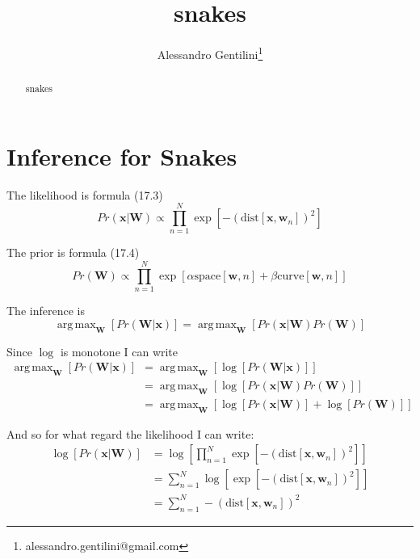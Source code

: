 \documentclass[a4paper,12pt]{article}
\title{snakes}
\author{Alessandro Gentilini\thanks{alessandro.gentilini@gmail.com}}
\DeclareMathOperator*{\argmax}{arg\,max}
\begin{document}
\maketitle

\begin{abstract}
snakes
\end{abstract} 

\section{Inference for Snakes}
The likelihood is formula (17.3)
\begin{equation}
Pr(\mathbf{x}\vert\mathbf{W})\propto \prod_{n=1}^N \exp{[-(\text{dist}[\mathbf{x},\mathbf{w}_n])^2]}
\end{equation}

The prior is formula (17.4)
\begin{equation}
Pr(\mathbf{W})\propto \prod_{n=1}^N \exp{[\alpha \text{space}[\mathbf{w},n]+\beta \text{curve}[\mathbf{w},n]]}
\end{equation}

The inference is 
\begin{equation}
\argmax_{\mathbf{W}}[Pr(\mathbf{W}\vert\mathbf{x})] = 
\argmax_{\mathbf{W}}[Pr(\mathbf{x}\vert\mathbf{W})Pr(\mathbf{W})]
\end{equation}

Since $\log$ is monotone I can write
\begin{equation}
\begin{split}
\argmax_{\mathbf{W}}[Pr(\mathbf{W}\vert\mathbf{x})] & = 
\argmax_{\mathbf{W}}[\log{[Pr(\mathbf{W}\vert\mathbf{x})]}] \\
& = \argmax_{\mathbf{W}}[\log{[Pr(\mathbf{x}\vert\mathbf{W})Pr(\mathbf{W})]}] \\
& = \argmax_{\mathbf{W}}[\log{[Pr(\mathbf{x}\vert\mathbf{W})]}+\log{[Pr(\mathbf{W})]}]
\end{split}
\end{equation}

And so for what regard the likelihood I can write:
\begin{equation}
\begin{split}
\log{[Pr(\mathbf{x}\vert\mathbf{W})]} & = \log{[\prod_{n=1}^N \exp{[-(\text{dist}[\mathbf{x},\mathbf{w}_n])^2]}]} \\
& =\sum_{n=1}^N \log{[\exp{[-(\text{dist}[\mathbf{x},\mathbf{w}_n])^2]}]} \\
& =\sum_{n=1}^N -(\text{dist}[\mathbf{x},\mathbf{w}_n])^2
\end{split}
\end{equation}
\end{document}
